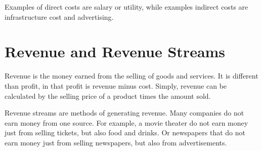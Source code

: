 \documentclass{standalone}
\begin{document}
Examples of direct costs are salary or utility, while examples indirect costs are infrastructure cost and advertising.

\section{Revenue and Revenue Streams}
Revenue is the money earned from the selling of goods and services.
It is different than profit, in that profit is revenue minus cost.
Simply, revenue can be calculated by the selling price of a product times the amount sold.

Revenue streams are methods of generating revenue.
Many companies do not earn money from one source.
For example, a movie theater do not earn money just from selling tickets, but also food and drinks.
Or newspapers that do not earn money just from selling newspapers, but also from advertisements.
\end{document}
